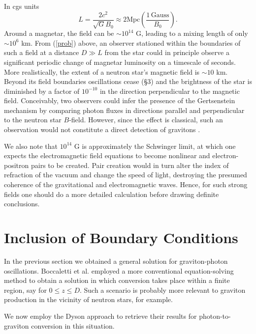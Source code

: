 \documentclass[12pt]{article}
\def\be{\begin{equation}}
\def\ee{\end{equation}}
\begin{document}
In cgs units 
\be
L = \frac{2 c^2}{\sqrt{G} B_0} \approx 2 \text{Mpc} \left(\frac{1 \,\text{Gauss}}{B_0}\right).
\ee
Around a magnetar, the field can be $\sim 10^{14}$ G, leading to a mixing length of only $\sim 10^6$ km.  From (\ref{prob}) above, an observer stationed within the boundaries of such a field at a distance $D \gg L$ from the star could in principle observe a significant periodic change of magnetar luminosity on a timescale of seconds. More realistically, the extent of a neutron star's magnetic field is $\sim 10$ km. Beyond its field boundaries oscillations cease (\S 3) and the brightness of the star is diminished by a factor of $10^{-10}$ in the direction perpendicular to the magnetic field. Conceivably, two observers could infer the presence of the Gertsenstein mechanism by comparing photon fluxes in directions parallel and perpendicular to the neutron star $B$-field. However, since the effect is classical, such an observation would not constitute a direct detection of gravitons \cite{RB06, BR06, Palessandro:2019tmj}.

We also note that $10^{14}$ G is approximately the Schwinger limit, at which one expects the electromagnetic field equations to become nonlinear and electron-positron pairs to be created.  Pair creation would in turn alter the index of refraction of the vacuum and change the speed of light, destroying the presumed coherence of the gravitational and electromagnetic waves. Hence, for such strong fields one should do a more detailed calculation before drawing definite conclusions.

\section{Inclusion of Boundary Conditions}
\setcounter{equation}{0}\label{sec3}

In the previous section we obtained a general solution for graviton-photon oscillations. Boccaletti et al. \cite{Bocc70} employed a more conventional equation-solving method to obtain a solution in which conversion takes place within a finite region, say for $0 \le z \le D$.  Such a scenario is probably more relevant to graviton production in the vicinity of neutron stars, for example.

We now employ the Dyson approach to retrieve their results for photon-to-graviton conversion in this situation.
\end{document}
